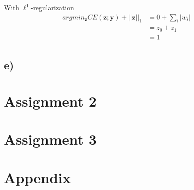 \documentclass{article}
\begin{document}
With $\ell^1$-regularization
\begin{equation}
    \begin{split}
        argmin_\mathbf{z} CE(\mathbf{z}; \mathbf{y}) + ||\mathbf{z}||_1 &= 0 + \sum_i |w_i|\\
                                                                        &= z_0 + z_1\\
                                                                        &= 1\\
    \end{split}
\end{equation}

\subsection*{e)}

\section{Assignment 2}
\section{Assignment 3}

\section{Appendix} 
%     
\end{document}
